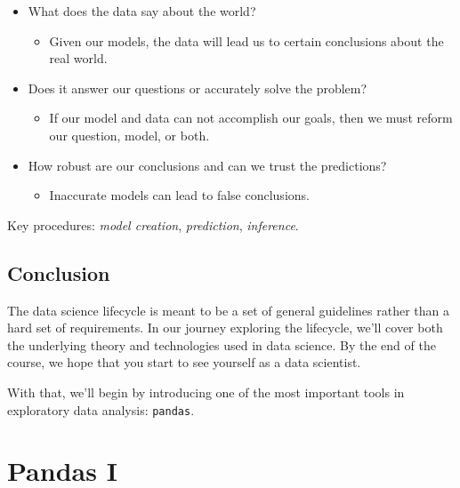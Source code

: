 \documentclass[
  letterpaper,
  DIV=11,
  numbers=noendperiod]{scrreprt}
\providecommand{\tightlist}{%
  \setlength{\itemsep}{0pt}\setlength{\parskip}{0pt}}\usepackage{longtable,booktabs,array}
\begin{document}
\begin{itemize}
\tightlist
\item
  What does the data say about the world?

  \begin{itemize}
  \tightlist
  \item
    Given our models, the data will lead us to certain conclusions about
    the real world.\\
  \end{itemize}
\item
  Does it answer our questions or accurately solve the problem?

  \begin{itemize}
  \tightlist
  \item
    If our model and data can not accomplish our goals, then we must
    reform our question, model, or both.\\
  \end{itemize}
\item
  How robust are our conclusions and can we trust the predictions?

  \begin{itemize}
  \tightlist
  \item
    Inaccurate models can lead to false conclusions.
  \end{itemize}
\end{itemize}

Key procedures: \emph{model creation}, \emph{prediction},
\emph{inference}.

\hypertarget{conclusion}{%
\section{Conclusion}\label{conclusion}}

The data science lifecycle is meant to be a set of general guidelines
rather than a hard set of requirements. In our journey exploring the
lifecycle, we'll cover both the underlying theory and technologies used
in data science. By the end of the course, we hope that you start to see
yourself as a data scientist.

With that, we'll begin by introducing one of the most important tools in
exploratory data analysis: \texttt{pandas}.


\hypertarget{pandas-i}{%
\chapter{Pandas I}\label{pandas-i}}
\end{document}
